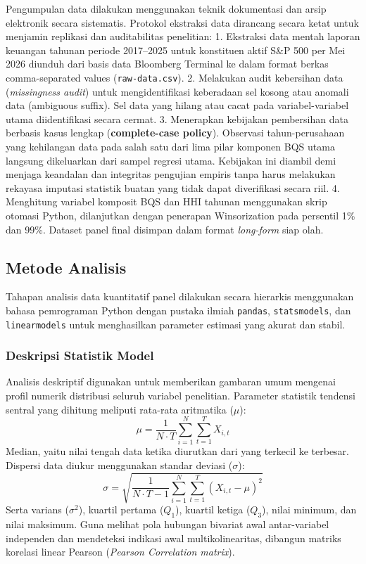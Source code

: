\documentclass[12pt,a4paper]{article}
\begin{document}
Pengumpulan data dilakukan menggunakan teknik dokumentasi dan arsip
elektronik secara sistematis. Protokol ekstraksi data dirancang secara
ketat untuk menjamin replikasi dan auditabilitas penelitian: 1.
Ekstraksi data mentah laporan keuangan tahunan periode 2017--2025 untuk
konstituen aktif S\&P 500 per Mei 2026 diunduh dari basis data Bloomberg
Terminal ke dalam format berkas comma-separated values
(\texttt{raw-data.csv}). 2. Melakukan audit kebersihan data
(\emph{missingness audit}) untuk mengidentifikasi keberadaan sel kosong
atau anomali data (ambiguous suffix). Sel data yang hilang atau cacat
pada variabel-variabel utama diidentifikasi secara cermat. 3. Menerapkan
kebijakan pembersihan data berbasis kasus lengkap (\textbf{complete-case
policy}). Observasi tahun-perusahaan yang kehilangan data pada salah
satu dari lima pilar komponen BQS utama langsung dikeluarkan dari sampel
regresi utama. Kebijakan ini diambil demi menjaga keandalan dan
integritas pengujian empiris tanpa harus melakukan rekayasa imputasi
statistik buatan yang tidak dapat diverifikasi secara riil. 4.
Menghitung variabel komposit BQS dan HHI tahunan menggunakan skrip
otomasi Python, dilanjutkan dengan penerapan Winsorization pada
persentil 1\% dan 99\%. Dataset panel final disimpan dalam format
\emph{long-form} siap olah.

\subsection{Metode Analisis}\label{metode-analisis}

Tahapan analisis data kuantitatif panel dilakukan secara hierarkis
menggunakan bahasa pemrograman Python dengan pustaka ilmiah
\texttt{pandas}, \texttt{statsmodels}, dan \texttt{linearmodels} untuk
menghasilkan parameter estimasi yang akurat dan stabil.

\subsubsection{Deskripsi Statistik
Model}\label{deskripsi-statistik-model}

Analisis deskriptif digunakan untuk memberikan gambaran umum mengenai
profil numerik distribusi seluruh variabel penelitian. Parameter
statistik tendensi sentral yang dihitung meliputi rata-rata aritmatika
(\(\mu\)): \begin{equation}
\mu = \frac{1}{N \cdot T} \sum_{i=1}^N \sum_{t=1}^T X_{i,t}
\end{equation} Median, yaitu nilai tengah data ketika diurutkan dari
yang terkecil ke terbesar. Dispersi data diukur menggunakan standar
deviasi (\(\sigma\)): \begin{equation}
\sigma = \sqrt{\frac{1}{N \cdot T - 1} \sum_{i=1}^N \sum_{t=1}^T (X_{i,t} - \mu)^2}
\end{equation} Serta varians (\(\sigma^2\)), kuartil pertama (\(Q_1\)),
kuartil ketiga (\(Q_3\)), nilai minimum, dan nilai maksimum. Guna
melihat pola hubungan bivariat awal antar-variabel independen dan
mendeteksi indikasi awal multikolinearitas, dibangun matriks korelasi
linear Pearson (\emph{Pearson Correlation matrix}).
\end{document}

